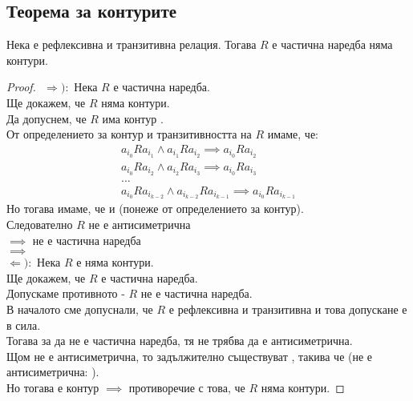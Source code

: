 \begin{example}
    
\end{example}

\subsection{Теорема за контурите}
\begin{theorem}
    Нека  е рефлексивна и транзитивна релация. Тогава \(R\) е частична наредба 
    \totw няма контури.

    \begin{proof}
        $ $\newline
        \(\Rightarrow):\) Нека \(R\) е частична наредба. \\
        Ще докажем, че \(R\) няма контури. \\
        Да допуснем, че \(R\) има контур . \\
        От определението за контур и транзитивността на \(R\) имаме, че: 
        \begin{align*}
            a_{i_0}Ra_{i_1} \land a_{i_1}Ra_{i_2} \implies a_{i_0}Ra_{i_2} \\
            a_{i_0}Ra_{i_2} \land a_{i_2}Ra_{i_3} \implies a_{i_0}Ra_{i_3} \\
            \dots \\ 
            a_{i_0}Ra_{i_{k - 2}} \land a_{i_{k - 2}}Ra_{i_{k - 1}} \implies a_{i_0}Ra_{i_{k - 1}}
        \end{align*}
        Но тогава имаме, че  и  (понеже  от 
        определението за контур). \\
        Следователно \(R\) не е антисиметрична \\ \(\implies\) не е частична наредба \\ \(\implies \) \lightning \\
        
        \(\Leftarrow):\) Нека \(R\) е няма контури. \\
        Ще докажем, че \(R\) е частична наредба. \\
        Допускаме противното - \(R\) не е частична наредба. \\
        В началото сме допуснали, че \(R\) е рефлексивна и транзитивна и това допускане е в сила. \\
        Тогава за да не е частична наредба, тя не трябва да е антисиметрична. \\
        Щом не е антисиметрична, то задължително съществуват , такива че 
         (не е антисиметрична: ). \\
        Но тогава  е контур \(\implies\) противоречие с това, 
        че \(R\) няма контури.
    \end{proof}
\end{theorem}

